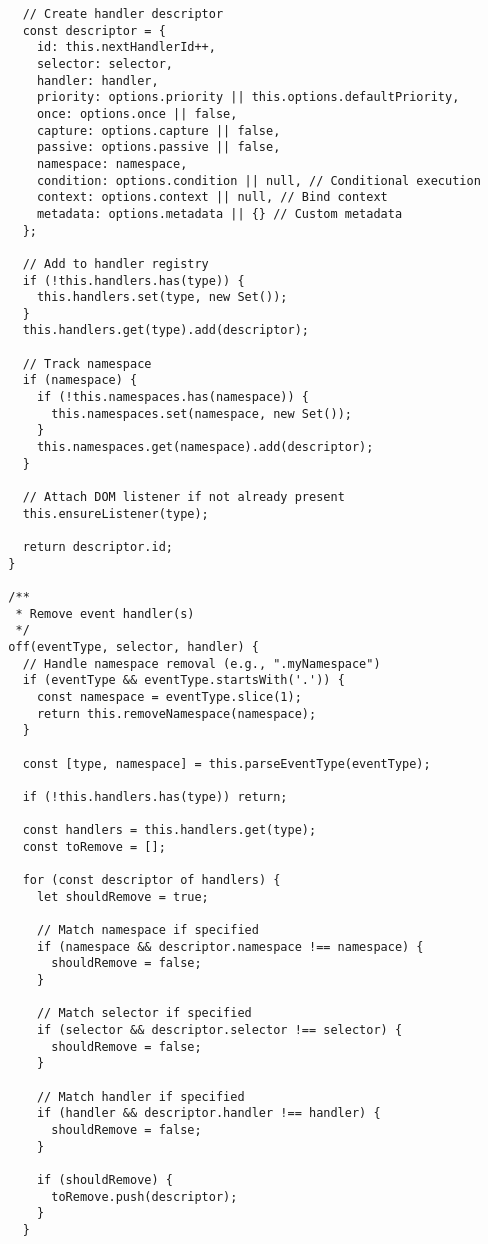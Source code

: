 \documentclass[11pt]{article}
\begin{document}
\begin{verbatim}
    // Create handler descriptor
    const descriptor = {
      id: this.nextHandlerId++,
      selector: selector,
      handler: handler,
      priority: options.priority || this.options.defaultPriority,
      once: options.once || false,
      capture: options.capture || false,
      passive: options.passive || false,
      namespace: namespace,
      condition: options.condition || null, // Conditional execution
      context: options.context || null, // Bind context
      metadata: options.metadata || {} // Custom metadata
    };
    
    // Add to handler registry
    if (!this.handlers.has(type)) {
      this.handlers.set(type, new Set());
    }
    this.handlers.get(type).add(descriptor);
    
    // Track namespace
    if (namespace) {
      if (!this.namespaces.has(namespace)) {
        this.namespaces.set(namespace, new Set());
      }
      this.namespaces.get(namespace).add(descriptor);
    }
    
    // Attach DOM listener if not already present
    this.ensureListener(type);
    
    return descriptor.id;
  }
  
  /**
   * Remove event handler(s)
   */
  off(eventType, selector, handler) {
    // Handle namespace removal (e.g., ".myNamespace")
    if (eventType && eventType.startsWith('.')) {
      const namespace = eventType.slice(1);
      return this.removeNamespace(namespace);
    }
    
    const [type, namespace] = this.parseEventType(eventType);
    
    if (!this.handlers.has(type)) return;
    
    const handlers = this.handlers.get(type);
    const toRemove = [];
    
    for (const descriptor of handlers) {
      let shouldRemove = true;
      
      // Match namespace if specified
      if (namespace && descriptor.namespace !== namespace) {
        shouldRemove = false;
      }
      
      // Match selector if specified
      if (selector && descriptor.selector !== selector) {
        shouldRemove = false;
      }
      
      // Match handler if specified
      if (handler && descriptor.handler !== handler) {
        shouldRemove = false;
      }
      
      if (shouldRemove) {
        toRemove.push(descriptor);
      }
    }
    

\end{verbatim}
\end{document}
